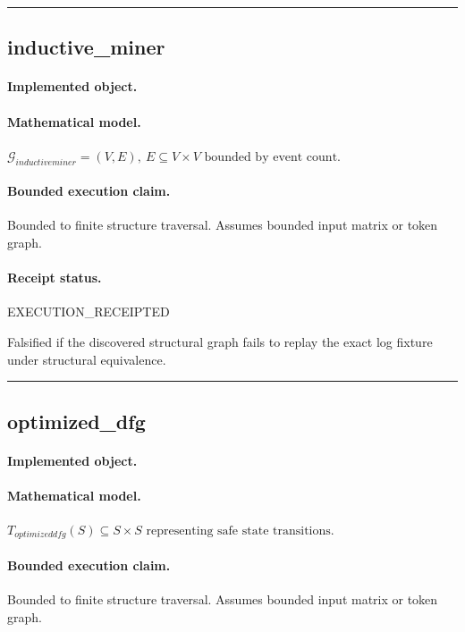 \vspace{1em}\hrule\vspace{1em}
\subsection{inductive\_miner}
\paragraph{Implemented object.} 
\paragraph{Mathematical model.} $\mathcal{G}_{inductiveminer} = (V, E), \ E \subseteq V \times V \text{ bounded by event count}.$
\paragraph{Bounded execution claim.} Bounded to finite structure traversal. Assumes bounded input matrix or token graph.
\paragraph{Receipt status.} EXECUTION\_RECEIPTED
\begin{falsifier}
Falsified if the discovered structural graph fails to replay the exact log fixture under structural equivalence.
\end{falsifier}

\vspace{1em}\hrule\vspace{1em}
\subsection{optimized\_dfg}
\paragraph{Implemented object.} 
\paragraph{Mathematical model.} $T_{optimizeddfg}(S) \subseteq S \times S \text{ representing safe state transitions}.$
\paragraph{Bounded execution claim.} Bounded to finite structure traversal. Assumes bounded input matrix or token graph.
